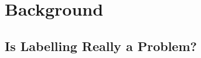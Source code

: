 \documentclass[10pt,conference]{IEEEtran}
\newcommand{\bi}{\begin{itemize}[leftmargin=0.4cm]}
\newcommand{\ei}{\end{itemize}}
\begin{document}








 

\section{Background}

\subsection{Is Labelling Really  a Problem?}
\end{document}
